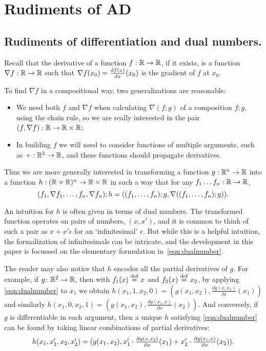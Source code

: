 \section{Rudiments of AD}

\subsection{Rudiments of differentiation and dual numbers.}
Recall that the derivative of a function $f:\mathbb{R}\to \mathbb{R}$, if it exists, is a function
$\nabla f:\mathbb{R}\to \mathbb{R}$ such that $\nabla f(x_0)=\frac {\mathop{}\!\mathrm{d} f(x)}{\mathop{}\!\mathrm{d} x}(x_0)$ is the gradient of $f$ at $x_0$. 

To find $\nabla f$ in a compositional way, two generalizations are reasonable:
\begin{itemize}
\item We need both $f$ and $\nabla f$ when calculating $\nabla (f;g)$
of a composition $f;g$, using the chain rule, so we are really interested in the pair $(f,\nabla f):\mathbb{R}\to \mathbb{R}\times \mathbb{R}$;
\item In building $f$ we will need to consider functions of multiple arguments, such as $+:\mathbb{R}^2\to \mathbb{R}$, and these functions should propagate derivatives.
\end{itemize}
Thus we are more generally interested in transforming a function $g:\mathbb{R}^n\to \mathbb{R}$ into a function
$h:(\mathbb{R}\times \mathbb{R})^n\to \mathbb{R}\times \mathbb{R}$ in such a way that for any
$f_1\dots f_n:\mathbb{R}\to\mathbb{R}$, 
\begin{equation}
  \label{eqn:dualnumber}
  (f_1,\nabla f_1,\dots, f_n,\nabla f_n);h
  =
  ((f_1,\dots, f_n);g,\nabla ((f_1, \dots, f_n);g))\text.
\end{equation}

An intuition for $h$ is often given in terms of dual numbers.
The transformed function operates on pairs of numbers, $(x,x')$, and it is common
to think of such a pair as $x+x'\epsilon$ for an `infinitesimal' $\epsilon$.
But while this is a helpful intuition, the formalization of infinitesimals can be intricate, 
and the development in this paper is focussed on the elementary formulation in~\eqref{eqn:dualnumber}. 

The reader may also notice that $h$ encodes all the partial derivatives of
$g$. For example, 
if $g \colon \mathbb{R}^2\to \mathbb{R}$, then with $f_1(x)\stackrel {\mathrm{def}}= x$ and $f_2(x)\stackrel {\mathrm{def}}= x_2$, by applying \eqref{eqn:dualnumber} to $x_1$ we obtain
$h(x_1,1,x_2,0)=(g(x_1,x_2), \frac {\partial g(x,x_2)}{\partial x}(x_1))$
and similarly 
$h(x_1,0,x_2,1)=(g(x_1,x_2), \frac {\partial g(x_1,x)}{\partial x}(x_2))$.
And conversely, if $g$ is differentiable in each argument, then
a unique $h$ satisfying \eqref{eqn:dualnumber} can be found by taking linear
combinations of partial derivatives:
\[\textstyle h(x_1,x_1',x_2,x_2')=(g(x_1,x_2),x_1' \cdot\frac {\partial g(x,x_2)}{\partial x}(x_1)+x_2'\cdot \frac {\partial g(x_1,x)}{\partial x}(x_2))\text.\]

